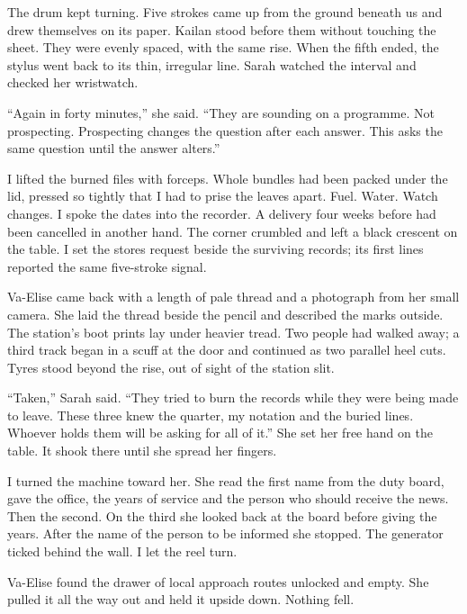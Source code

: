The drum kept turning. Five strokes came up from the ground beneath us and drew themselves on its paper. Kailan stood before them without touching the sheet. They were evenly spaced, with the same rise. When the fifth ended, the stylus went back to its thin, irregular line. Sarah watched the interval and checked her wristwatch.\par

``Again in forty minutes,'' she said. ``They are sounding on a programme. Not prospecting. Prospecting changes the question after each answer. This asks the same question until the answer alters.''\par

I lifted the burned files with forceps. Whole bundles had been packed under the lid, pressed so tightly that I had to prise the leaves apart. Fuel. Water. Watch changes. I spoke the dates into the recorder. A delivery four weeks before had been cancelled in another hand. The corner crumbled and left a black crescent on the table. I set the stores request beside the surviving records; its first lines reported the same five-stroke signal.\par

Va-Elise came back with a length of pale thread and a photograph from her small camera. She laid the thread beside the pencil and described the marks outside. The station's boot prints lay under heavier tread. Two people had walked away; a third track began in a scuff at the door and continued as two parallel heel cuts. Tyres stood beyond the rise, out of sight of the station slit.\par

``Taken,'' Sarah said. ``They tried to burn the records while they were being made to leave. These three knew the quarter, my notation and the buried lines. Whoever holds them will be asking for all of it.'' She set her free hand on the table. It shook there until she spread her fingers.\par

I turned the machine toward her. She read the first name from the duty board, gave the office, the years of service and the person who should receive the news. Then the second. On the third she looked back at the board before giving the years. After the name of the person to be informed she stopped. The generator ticked behind the wall. I let the reel turn.\par

Va-Elise found the drawer of local approach routes unlocked and empty. She pulled it all the way out and held it upside down. Nothing fell.\par

